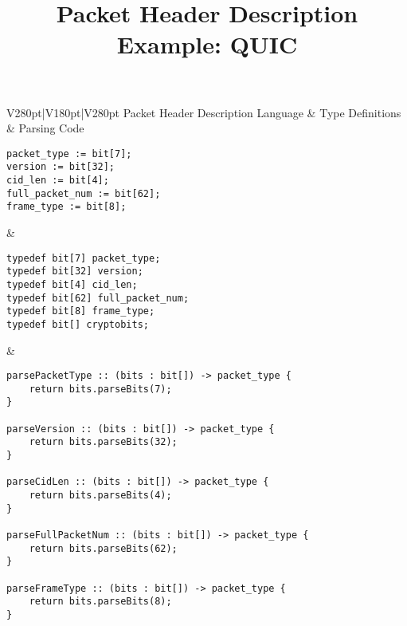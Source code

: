 \documentclass[10pt,a4paper,landscape]{article}
\title{Packet Header Description Example: QUIC}
\date{}
\begin{document}
\maketitle
	\begin{longtable}{V{280pt}|V{180pt}|V{280pt}}
	\toprule
	Packet Header Description Language & Type Definitions & Parsing Code \\
	\hline
		\begin{Verbatim}[fontsize=\small]
packet_type := bit[7];
version := bit[32];
cid_len := bit[4];
full_packet_num := bit[62];
frame_type := bit[8];
		\end{Verbatim}
		& 
		\begin{Verbatim}[fontsize=\small]
typedef bit[7] packet_type;
typedef bit[32] version;
typedef bit[4] cid_len;
typedef bit[62] full_packet_num;
typedef bit[8] frame_type;
typedef bit[] cryptobits;
		\end{Verbatim}
		 &
		\begin{Verbatim}[fontsize=\small]
parsePacketType :: (bits : bit[]) -> packet_type {
    return bits.parseBits(7);
}

parseVersion :: (bits : bit[]) -> packet_type {
    return bits.parseBits(32);
} 

parseCidLen :: (bits : bit[]) -> packet_type {
    return bits.parseBits(4);
} 

parseFullPacketNum :: (bits : bit[]) -> packet_type {
    return bits.parseBits(62);
} 

parseFrameType :: (bits : bit[]) -> packet_type {
    return bits.parseBits(8);
}


\end{Verbatim}
\end{longtable}
\end{document}
